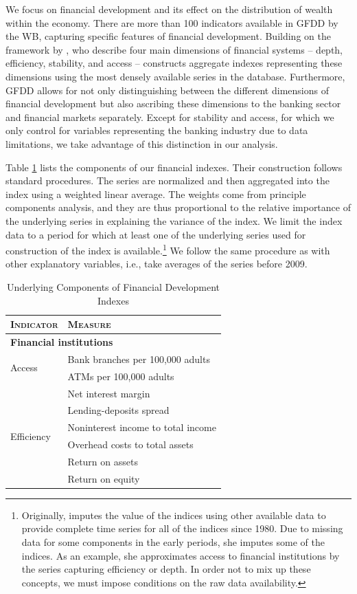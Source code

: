 \begin{refsection}
We focus on financial development and its effect on the distribution of wealth within the economy. There are more than 100 indicators available in \ac{GFDD} by the \ac{WB}, capturing specific features of financial development. Building on the framework by \textcite{Cihaketal2013}, who describe four main dimensions of financial systems -- depth, efficiency, stability, and access -- \textcite{svirydzenka2016introducing} constructs aggregate indexes representing these dimensions using the most densely available series in the database. Furthermore, \ac{GFDD} allows for not only distinguishing between the different dimensions of financial development but also ascribing these dimensions to the banking sector and financial markets separately. Except for stability and access, for which we only control for variables representing the banking industry due to data limitations, we take advantage of this distinction in our analysis.

Table \ref{ch3tab:components} lists the components of our financial indexes. Their construction follows standard procedures. The series are normalized and then aggregated into the index using a weighted linear average. The weights come from principle components analysis, and they are thus proportional to the relative importance of the underlying series in explaining the variance of the index. We limit the index data to a period for which at least one of the underlying series used for construction of the index is available.\footnote{Originally, \textcite{svirydzenka2016introducing} imputes the value of the indices using other available data to provide complete time series for all of the indices since 1980. Due to missing data for some components in the early periods, she imputes some of the indices. As an example, she approximates access to financial institutions by the series capturing efficiency or depth. In order not to mix up these concepts, we must impose conditions on the raw data availability.} We follow the same procedure as with other explanatory variables, i.e., take averages of the series before 2009.
%
%
\begin{table}[ht!]
\small
\caption{Underlying Components of Financial Development Indexes}
\label{ch3tab:components}
\centering
\begin{tabular}{ll}
  \toprule
  \textsc{Indicator} & \textsc{Measure} \\
  \midrule
  \multicolumn{2}{l}{\textbf{Financial institutions}} \\
  \midrule
  \multirow{2}{*}{Access} 	& Bank branches per 100,000 adults \\
  							& ATMs per 100,000 adults \\
  \midrule
  \multirow{6}{*}{Efficiency}		& Net interest margin \\
  							& Lending-deposits spread \\ 
  							& Noninterest income to total income \\
  							& Overhead costs to total assets \\
  							& Return on assets \\
  							& Return on equity \\
		

\end{tabular}
\end{table}
\end{refsection}
